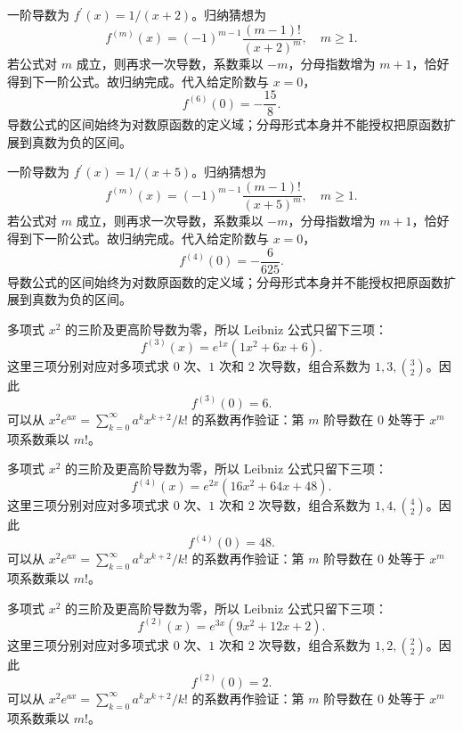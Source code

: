 \documentclass[12pt,fontset=fandol]{ctexart}
\begin{document}
\begin{solve}\label{ans:c9q17}
一阶导数为 $f^{\prime}(x)=1/(x+2)$。归纳猜想为
\[
f^{(m)}(x)=(-1)^{m-1}\frac{(m-1)!}{(x+2)^m},\quad m\ge1.
\]
若公式对 $m$ 成立，则再求一次导数，系数乘以 $-m$，分母指数增为 $m+1$，恰好得到下一阶公式。故归纳完成。代入给定阶数与 $x=0$，
\[
f^{(6)}(0)=-\frac{15}{8}.
\]
导数公式的区间始终为对数原函数的定义域；分母形式本身并不能授权把原函数扩展到真数为负的区间。
\end{solve}

\begin{solve}\label{ans:c9q18}
一阶导数为 $f^{\prime}(x)=1/(x+5)$。归纳猜想为
\[
f^{(m)}(x)=(-1)^{m-1}\frac{(m-1)!}{(x+5)^m},\quad m\ge1.
\]
若公式对 $m$ 成立，则再求一次导数，系数乘以 $-m$，分母指数增为 $m+1$，恰好得到下一阶公式。故归纳完成。代入给定阶数与 $x=0$，
\[
f^{(4)}(0)=-\frac{6}{625}.
\]
导数公式的区间始终为对数原函数的定义域；分母形式本身并不能授权把原函数扩展到真数为负的区间。
\end{solve}

\begin{solve}\label{ans:c9q19}
多项式 $x^2$ 的三阶及更高阶导数为零，所以 Leibniz 公式只留下三项：
\[
f^{(3)}(x)=e^{1x}\left(1x^2+6x+6\right).
\]
这里三项分别对应对多项式求 $0$ 次、$1$ 次和 $2$ 次导数，组合系数为 $1,3,\binom{3}2$。因此
\[
f^{(3)}(0)=6.
\]
可以从 $x^2e^{ax}=\sum_{k=0}^\infty a^kx^{k+2}/k!$ 的系数再作验证：第 $m$ 阶导数在 $0$ 处等于 $x^m$ 项系数乘以 $m!$。
\end{solve}

\begin{solve}\label{ans:c9q20}
多项式 $x^2$ 的三阶及更高阶导数为零，所以 Leibniz 公式只留下三项：
\[
f^{(4)}(x)=e^{2x}\left(16x^2+64x+48\right).
\]
这里三项分别对应对多项式求 $0$ 次、$1$ 次和 $2$ 次导数，组合系数为 $1,4,\binom{4}2$。因此
\[
f^{(4)}(0)=48.
\]
可以从 $x^2e^{ax}=\sum_{k=0}^\infty a^kx^{k+2}/k!$ 的系数再作验证：第 $m$ 阶导数在 $0$ 处等于 $x^m$ 项系数乘以 $m!$。
\end{solve}

\begin{solve}\label{ans:c9q21}
多项式 $x^2$ 的三阶及更高阶导数为零，所以 Leibniz 公式只留下三项：
\[
f^{(2)}(x)=e^{3x}\left(9x^2+12x+2\right).
\]
这里三项分别对应对多项式求 $0$ 次、$1$ 次和 $2$ 次导数，组合系数为 $1,2,\binom{2}2$。因此
\[
f^{(2)}(0)=2.
\]
可以从 $x^2e^{ax}=\sum_{k=0}^\infty a^kx^{k+2}/k!$ 的系数再作验证：第 $m$ 阶导数在 $0$ 处等于 $x^m$ 项系数乘以 $m!$。
\end{solve}
\end{document}
